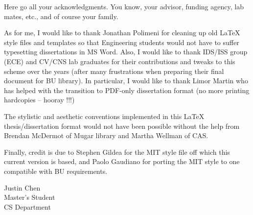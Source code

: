 Here go all your acknowledgments. You know, your advisor, funding agency, lab
mates, etc., and of course your family.

As for me, I would like to thank Jonathan Polimeni for cleaning up old LaTeX
style files and templates so that Engineering students would not have to suffer
typesetting dissertations in MS Word. Also, I would like to thank IDS/ISS
group (ECE) and CV/CNS lab graduates for their contributions and tweaks to this
scheme over the years (after many frustrations when preparing their final
document for BU library). In particular, I would like to thank Limor Martin who
has helped with the transition to PDF-only dissertation format (no more printing
hardcopies -- hooray !!!)

The stylistic and aesthetic conventions implemented in this LaTeX
thesis/dissertation format would not have been possible without the help from
Brendan McDermot of Mugar library and Martha Wellman of CAS.

Finally, credit is due to Stephen Gildea for the MIT style file off which this
current version is based, and Paolo Gaudiano for porting the MIT style to one
compatible with BU requirements.

\vskip 1in

\noindent
Justin Chen\\
Master's Student\\
CS Department